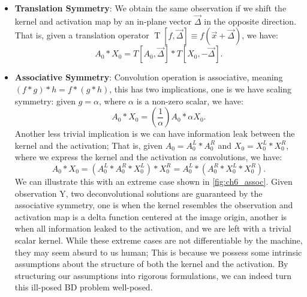 \begin{itemize}
	\item \textbf{Translation Symmetry}: We obtain the same observation if we shift the kernel and activation map by an in-plane vector $\vec{\Delta}$ in the opposite direction. That is, given a translation operator $\operatorname{T}[f,\vec{\Delta}] \equiv f(\vec{x}+\vec{\Delta})$, we have:  
	\begin{equation}
		A_0 * X_0 = T[A_0,\vec{\Delta}] * T[X_0, -\vec{\Delta}].
	\end{equation}
	\item \textbf{Associative Symmetry}: Convolution operation is associative, meaning $(f * g) * h = f * (g *h)$, this has two implications, one is we have scaling symmetry: given $g = \alpha$, where $\alpha$ is a non-zero scalar, we have: 
	\begin{equation}
		A_0 * X_0 = (\frac{1}{\alpha})A_0*\alpha X_0.
	\end{equation}
	Another less trivial implication is we can have information leak between the kernel and the activation; That is, given $A_0 = A_0^L * A_0^R$ and $X_0= X_0^L * X_0^R$, where we express the kernel and the activation as convolutions, we have: 
	\begin{equation}
		A_0 * X_0 = (A_0^L * A_0^R * X_0^L) * X_0^R = A_0^L * (A_0^R * X_0^L * X_0^R).
	\end{equation}
	We can illustrate this with an extreme case shown in \ref{fig:ch6_assoc}. Given observation Y, two deconvolutional solutions are guaranteed by the associative symmetry, one is when the kernel resembles the observation and activation map is a delta function centered at the image origin, another is when all information leaked to the activation, and we are left with a trivial scalar kernel. While these extreme cases are not differentiable by the machine, they may seem absurd to us human; This is because we possess some intrinsic assumptions about the structure of both the kernel and the activation. By structuring our assumptions into rigorous formulations, we can indeed turn this ill-posed \ac{BD} problem well-posed. 
	
\end{itemize}



